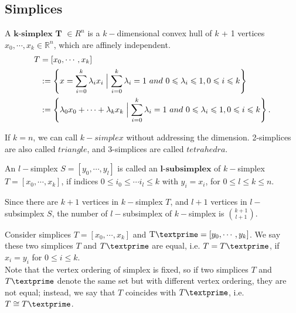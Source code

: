     \subsection{Simplices}
    \noindent
    \begin{definition*}
    A $\textbf{k-simplex T}$ $\in{R}^n$ is a ${k-}$dimensional convex hull of ${k}$ + 1 vertices ${x}_0, \cdots, {x}_k \in \mathbb{R}^n$, which are affinely independent.\\
    \begin{equation*}
    \begin{split}
    {T} & = [{x}_0, \cdots, {x}_k ]\\
    & := \left\{{x} = \sum\limits_{i=0}^k \lambda_i {x}_i \Bigm| \sum\limits_{i=0}^k \lambda_i = 1 ~and~ 0 \leqslant \lambda_i \leqslant 1, 0 \leqslant i \leqslant k \right\}\\
    & := \left\{\lambda_0{x}_0 + \cdots + \lambda_k{x}_k \Bigm| \sum\limits_{i=0}^k \lambda_i = 1 ~and~ 0 \leqslant \lambda_i \leqslant 1, 0 \leqslant i \leqslant k \right\}.
    \end{split}
    \end{equation*}
    \end{definition*}
    If ${k} = n$, we can call ${k-simplex}$ without addressing the dimension. 2-simplices are also called ${triangle}$, and 3-simplices are called ${tetrahedra}$.

    \begin{definition*}
    An ${l-}$simplex ${S} = [{y}_0, \cdots, {y}_l]$ is called an $\textbf{l-subsimplex}$ of ${k-}$simplex ${T} = [{x}_0, \cdots, {x}_k]$, if indices $0 \leqslant {i}_0 \leqslant \cdots {i}_l \leqslant k$ with ${y}_i = {x}_i$, for $0 \leqslant l \leqslant k \leqslant n$.
    \end{definition*}
    Since there are $k+1$ vertices in ${k-}$simplex ${T}$, and $l+1$ vertices in ${l-}$subsimplex ${S}$, the number of ${l-}$subsimplex of ${k-}$simplex is $\binom{k+1}{l+1}$.


    Consider simplices ${T} = [{x}_0, \cdots, {x}_k]$ and $\text{T\textprime} = [{y}_0, \cdots, {y}_k]$. We say these two simplices ${T}$ and ${T\textprime}$ are equal, i.e. ${T} = {T\textprime}$, if ${x}_i = {y}_i$ for $0 \leqslant i \leqslant k$. \\
    Note that the vertex ordering of simplex is fixed, so if two simplices ${T}$ and ${T\textprime}$ denote the same set but with different vertex ordering, they are not equal; instead, we say that ${T}$ coincides with ${T\textprime}$, i.e. ${T} \cong {T\textprime}$.

